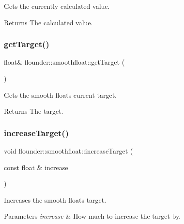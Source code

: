 Gets the currently calculated value. 

\begin{DoxyReturn}{Returns}
The calculated value. 
\end{DoxyReturn}
\mbox{\label{classflounder_1_1smoothfloat_a07b3fc6ab9b4eb9de5bf403868880650}} 
\subsubsection{\texorpdfstring{get\+Target()}{getTarget()}}
{\footnotesize\ttfamily float\& flounder\+::smoothfloat\+::get\+Target (\begin{DoxyParamCaption}{ }\end{DoxyParamCaption})\hspace{0.3cm}{\ttfamily [inline]}}



Gets the smooth floats current target. 

\begin{DoxyReturn}{Returns}
The target. 
\end{DoxyReturn}
\mbox{\label{classflounder_1_1smoothfloat_a47a9df312c81c9a9c8f5bc8df3b886a1}} 
\subsubsection{\texorpdfstring{increase\+Target()}{increaseTarget()}}
{\footnotesize\ttfamily void flounder\+::smoothfloat\+::increase\+Target (\begin{DoxyParamCaption}\item[{const float \&}]{increase }\end{DoxyParamCaption})\hspace{0.3cm}{\ttfamily [inline]}}



Increases the smooth floats target. 


\begin{DoxyParams}{Parameters}
{\em increase} & How much to increase the target by. \\
\hline
\end{DoxyParams}
\mbox{\label{classflounder_1_1smoothfloat_a4e860cb265fb463b281442ee6c8d3b57}} 
